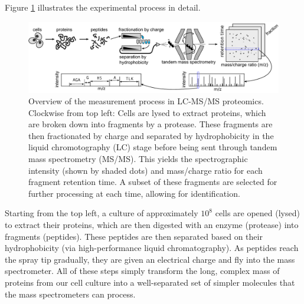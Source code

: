 Figure \ref{proteomics:fig:Mass_Spec_Overview} illustrates the experimental process in detail.
%
\ifx\nofigures\undefined
\begin{figure}[t]
 \centering
 \includegraphics[width=\textwidth]{figures/proteomics/mass-spec-errors-awb}
 \caption{Overview of the measurement process in LC-MS/MS proteomics. 
 Clockwise from top left: Cells are lysed to extract proteins, which are broken down into fragments by a protease.
These fragments are then fractionated by charge and separated by hydrophobicity in the liquid chromotography (LC) stage before being sent through tandem mass spectrometry (MS/MS).
This yields the spectrographic intensity (shown by shaded dots) and mass/charge ratio for each fragment retention time.
A subset of these fragments are selected for further processing at each time, allowing for identification.
\label{proteomics:fig:Mass_Spec_Overview}}
\end{figure}
\fi
%
Starting from the top left, a culture of approximately $10^{8}$ cells are opened (lysed) to extract their proteins, which are then digested with an enzyme (protease) into fragments (peptides).
These peptides are then separated based on their hydrophobicity (via high-performance liquid chromatography).
As peptides reach the spray tip gradually, they are given an electrical charge and fly into the mass spectrometer.
All of these steps simply transform the long, complex mass of proteins from our cell culture into a well-separated set of simpler molecules that the mass spectrometers can process.

